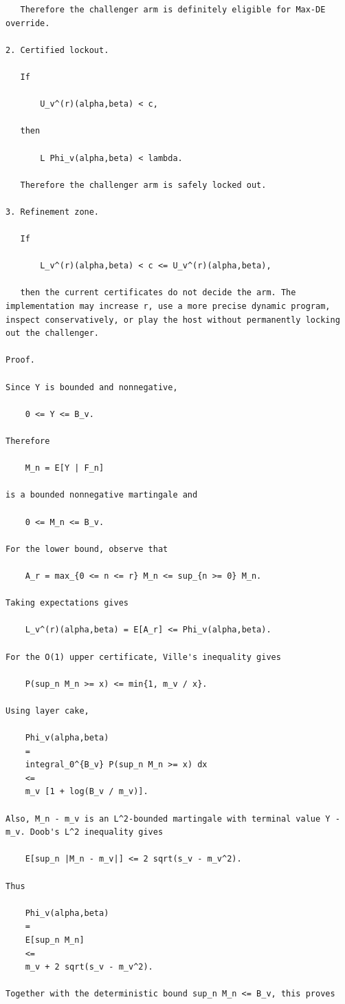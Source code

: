 \begin{small}
\begin{verbatim}
   Therefore the challenger arm is definitely eligible for Max-DE override.

2. Certified lockout.

   If

       U_v^(r)(alpha,beta) < c,

   then

       L Phi_v(alpha,beta) < lambda.

   Therefore the challenger arm is safely locked out.

3. Refinement zone.

   If

       L_v^(r)(alpha,beta) < c <= U_v^(r)(alpha,beta),

   then the current certificates do not decide the arm. The implementation may increase r, use a more precise dynamic program, inspect conservatively, or play the host without permanently locking out the challenger.

Proof.

Since Y is bounded and nonnegative,

    0 <= Y <= B_v.

Therefore

    M_n = E[Y | F_n]

is a bounded nonnegative martingale and

    0 <= M_n <= B_v.

For the lower bound, observe that

    A_r = max_{0 <= n <= r} M_n <= sup_{n >= 0} M_n.

Taking expectations gives

    L_v^(r)(alpha,beta) = E[A_r] <= Phi_v(alpha,beta).

For the O(1) upper certificate, Ville's inequality gives

    P(sup_n M_n >= x) <= min{1, m_v / x}.

Using layer cake,

    Phi_v(alpha,beta)
    =
    integral_0^{B_v} P(sup_n M_n >= x) dx
    <=
    m_v [1 + log(B_v / m_v)].

Also, M_n - m_v is an L^2-bounded martingale with terminal value Y - m_v. Doob's L^2 inequality gives

    E[sup_n |M_n - m_v|] <= 2 sqrt(s_v - m_v^2).

Thus

    Phi_v(alpha,beta)
    =
    E[sup_n M_n]
    <=
    m_v + 2 sqrt(s_v - m_v^2).

Together with the deterministic bound sup_n M_n <= B_v, this proves


\end{verbatim}
\end{small}
